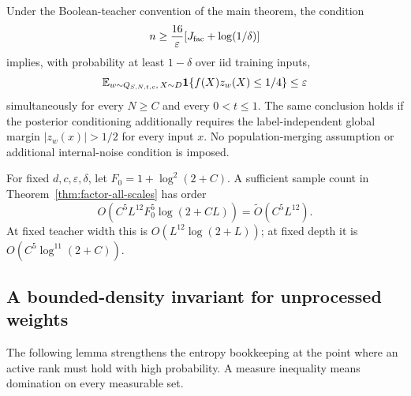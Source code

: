 \begin{theorem}
\label{thm:factor-all-scales}
Under the Boolean-teacher convention of the main theorem, the condition
\begin{equation}\label{eq:factor-sample-budget}
 n\ge\frac{16}{\varepsilon}
             [J_{\rm fac}+\log(1/\delta)]
\end{equation}
implies, with probability at least $1-\delta$ over iid training inputs,
\[
 \mathbb E_{w\sim Q_{S,N,t,c},\,X\sim D}
       \mathbf1\{f(X)z_w(X)\le1/4\}\le\varepsilon
\]
simultaneously for every $N\ge C$ and every $0<t\le1$.
The same conclusion holds if the posterior conditioning additionally
requires the label-independent global margin $|z_w(x)|>1/2$ for every
input $x$.
No population-merging assumption or additional internal-noise condition
is imposed.
\end{theorem}

\begin{corollary}
\label{cor:factor-powers}
For fixed $d,c,\varepsilon,\delta$, let $F_0=1+\log^2(2+C)$.
A sufficient sample count in Theorem~\ref{thm:factor-all-scales} has order
\begin{equation}\label{eq:factor-powers}
 O\!\left(C^5L^{12}F_0^5\log(2+CL)\right)
       =\widetilde O(C^5L^{12}).
\end{equation}
At fixed teacher width this is $O(L^{12}\log(2+L))$; at fixed depth it is
$O(C^5\log^{11}(2+C))$.
\end{corollary}

\subsection{A bounded-density invariant for unprocessed weights}

The following lemma strengthens the entropy bookkeeping at the point
where an active rank must hold with high probability. A measure inequality
means domination on every measurable set.


